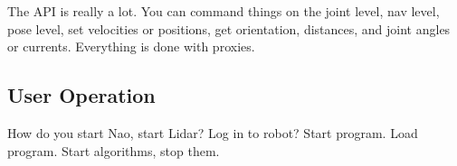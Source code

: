 The API is really a lot. You can command things on the joint level, nav level, pose level,
set velocities or positions, get orientation, distances, and joint angles or currents.
Everything is done with proxies.

\subsection{User Operation}
How do you start Nao, start Lidar? Log in to robot? Start program. Load program.
Start algorithms, stop them.
